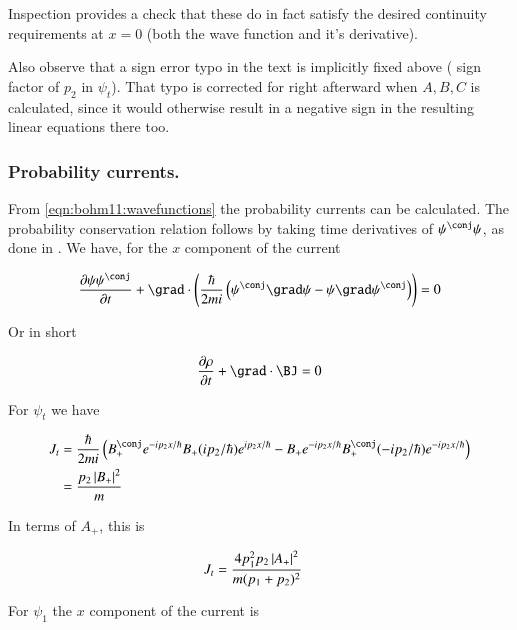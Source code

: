Inspection provides a check that these do in fact satisfy the desired
continuity requirements at $x=0$ (both the wave function and it's derivative).

Also observe that a sign error typo in the text is implicitly fixed above (
sign factor of $p_2$ in $\psi_t$).  That typo is corrected for right afterward when $A,B,C$ is calculated, since it would otherwise result in a negative sign in the resulting linear equations there too.

\subsubsection{Probability currents. }

From \ref{eqn:bohm11:wavefunctions}
the probability currents can be calculated.  The probability
conservation relation follows by taking time derivatives of $\psi^\conj\psi$, as done in \cite{PJprobCurrent}.  We have, for the $x$ component of the current

\begin{align*}
\PD{t}{\psi\psi^\conj} + \grad \cdot \left(
\frac{\hbar}{2 m i}
\left(
\psi^\conj \grad \psi
-\psi \grad \psi^\conj
\right)
\right) = 0
\end{align*}

Or in short

\begin{align*}
\PD{t}{\rho} + \grad \cdot \BJ = 0
\end{align*}

For $\psi_t$ we have

\begin{align*}
J_t
&=
\frac{\hbar}{2 m i}
\left(
B_{+}^\conj e^{ -i p_2 x/\hbar }
B_{+} (i p_2 /\hbar)e^{ i p_2 x/\hbar }
-B_{+} e^{ -i p_2 x/\hbar }
B_{+}^\conj (-i p_2 /\hbar)e^{ -i p_2 x/\hbar }
\right) \\
&= \frac{ p_2 \Abs{ B_{+} }^2}{m } \\
\end{align*}

In terms of $A_{+}$, this is

\begin{align}\label{eqn:bohm11:currentTransmitted}
J_t &= \frac{ 4 p_1^2 p_2 \left\lvert{ A_{+} }\right\rvert^2}{m (p_1 + p_2)^2}
\end{align}

For $\psi_1$ the $x$ component of the current is

